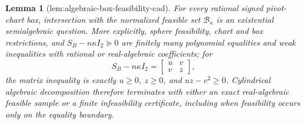 \documentclass{article}
\newtheorem{lemma}{Lemma}
\begin{document}
\begin{lemma}[lem:algebraic-box-feasibility-cad]\label{lem:algebraic-box-feasibility-cad}
For every rational signed pivot-chart box, intersection with the normalized feasible set \(\mathcal B_\kappa\) is an existential semialgebraic question.  More explicitly, sphere feasibility, chart and box restrictions, and \(S_B-n\kappa I_2\succeq0\) are finitely many polynomial equalities and weak inequalities with rational or real-algebraic coefficients; for
\[
 S_B-n\kappa I_2=\begin{bmatrix}u&v\\v&z\end{bmatrix},
\]
the matrix inequality is exactly \(u\ge0\), \(z\ge0\), and \(uz-v^2\ge0\).  Cylindrical algebraic decomposition therefore terminates with either an exact real-algebraic feasible sample or a finite infeasibility certificate, including when feasibility occurs only on the equality boundary.
\end{lemma}
\end{document}

